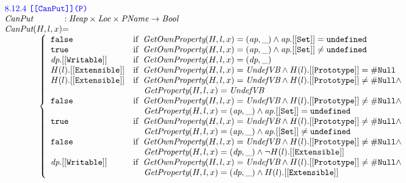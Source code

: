\documentclass[a4paper, leqno]{amsart}
\newcommand{\rulesep}{\quad\quad}
\def\inblue{\color{blue}}
\newcommand{\UndefVB}{\emph{UndefVB}}
\newcommand{\nullL}{{\tt \#Null}}
\newcommand{\undef}{{\tt undefined}}
\newcommand{\false}{{\tt false}}
\newcommand{\true}{{\tt true}}
\newcommand{\Bool}{\emph{Bool}}
\newcommand{\Loc}{\emph{Loc}}
\newcommand{\Heap}{\emph{Heap}}
\newcommand{\Prop}{\emph{PName}}
\newcommand{\hf}[1]{\emph{#1}}
\newcommand{\ifc}[1]{{\rm if}\begin{array}[t]{l}#1\end{array}}
\def\inblue{\color{blue}}
\begin{document}
\[\begin{array}{l@{}c@{}l}
\multicolumn{3}{l}{\mbox{\inblue 8.12.4 {\tt [[CanPut]](P)}}}\\
\hf{CanPut} & :& \Heap \times \Loc \times \Prop \rightarrow \Bool \\
\hf{CanPut}(H,l,x) &=&\\
\multicolumn{3}{l}{
\rulesep\rulesep
\left\{\begin{array}{ll}
\false &\ifc{\hf{GetOwnProperty}(H,l,x) = (\emph{ap},\_) \wedge \emph{ap}.{\tt[[Set]]} = \undef}\\
\true &\ifc{\hf{GetOwnProperty}(H,l,x) = (\emph{ap},\_) \wedge \emph{ap}.{\tt[[Set]]} \not= \undef}\\
\hf{dp}.{\tt[[Writable]]} &\ifc{\hf{GetOwnProperty}(H,l,x) = (\emph{dp},\_)}\\
H(l).{\tt[[Extensible]]}
&\ifc{\hf{GetOwnProperty}(H,l,x) = \UndefVB\wedge H(l).{\tt[[Prototype]]} = \nullL}\\
H(l).{\tt[[Extensible]]}
&\ifc{\hf{GetOwnProperty}(H,l,x) = \UndefVB\wedge H(l).{\tt[[Prototype]]} \not= \nullL\wedge}\\
&\mbox{\phantom{ if\ }$\hf{GetProperty}(H,l,x)=\UndefVB$}\\
\false
&\ifc{\hf{GetOwnProperty}(H,l,x) = \UndefVB\wedge H(l).{\tt[[Prototype]]} \not= \nullL\wedge}\\
&\mbox{\phantom{ if\ }$\hf{GetProperty}(H,l,x)=(\emph{ap}, \_)\wedge
\emph{ap}.{\tt[[Set]]} = \undef$}\\
\true
&\ifc{\hf{GetOwnProperty}(H,l,x) = \UndefVB\wedge H(l).{\tt[[Prototype]]} \not= \nullL\wedge}\\
&\mbox{\phantom{ if\ }$\hf{GetProperty}(H,l,x)=(\emph{ap}, \_)\wedge
\emph{ap}.{\tt[[Set]]} \not= \undef$}\\
\false
&\ifc{\hf{GetOwnProperty}(H,l,x) = \UndefVB\wedge H(l).{\tt[[Prototype]]} \not= \nullL\wedge}\\
&\mbox{\phantom{ if\ }$\hf{GetProperty}(H,l,x)=(\emph{dp}, \_)\wedge
\neg H(l).{\tt[[Extensible]]}$}\\
\emph{dp}.{\tt[[Writable]]}
&\ifc{\hf{GetOwnProperty}(H,l,x) = \UndefVB\wedge H(l).{\tt[[Prototype]]} \not= \nullL\wedge}\\
&\mbox{\phantom{ if\ }$\hf{GetProperty}(H,l,x)=(\emph{dp}, \_)\wedge
H(l).{\tt[[Extensible]]}$}\\
\end{array}\right.
}
\\\\

\end{array}
\]
\end{document}
